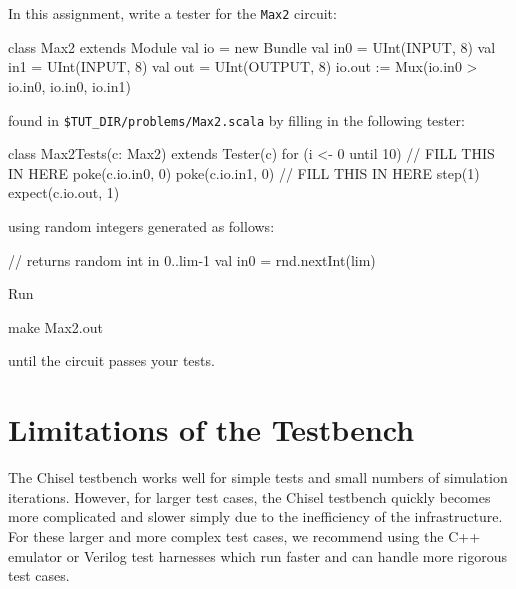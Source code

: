 \section{}

In this assignment, write a tester for the \verb+Max2+ circuit:

\begin{scala}
class Max2 extends Module {
  val io = new Bundle {
    val in0 = UInt(INPUT,  8)
    val in1 = UInt(INPUT,  8)
    val out = UInt(OUTPUT, 8)
  }
  io.out := Mux(io.in0 > io.in0, io.in0, io.in1)
}
\end{scala}

\noindent
found in \verb+$TUT_DIR/problems/Max2.scala+ by filling in the following tester:

\begin{scala}
class Max2Tests(c: Max2) extends Tester(c) {
  for (i <- 0 until 10) {
    // FILL THIS IN HERE
    poke(c.io.in0, 0)
    poke(c.io.in1, 0)
    // FILL THIS IN HERE
    step(1)
    expect(c.io.out, 1)
  }
}
\end{scala}

\noindent 
using random integers generated as follows:

\begin{scala}
// returns random int in 0..lim-1
val in0 = rnd.nextInt(lim) 
\end{scala}

\noindent
Run 

\begin{bash}
make Max2.out
\end{bash}

\noindent 
until the circuit passes your tests.

\section{Limitations of the Testbench}

The Chisel testbench works well for simple tests and small numbers of simulation iterations. However, for larger test cases, the Chisel testbench quickly becomes more complicated and slower simply due to the inefficiency of the infrastructure. For these larger and more complex test cases, we recommend using the C++ emulator or Verilog test harnesses which run faster and can handle more rigorous test cases.

